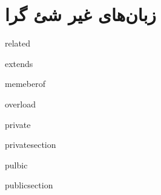 

\section{زبان‌های غیر شئ گرا}

related

extends

memeberof

overload

private

privatesection

pulbic

publicsection

